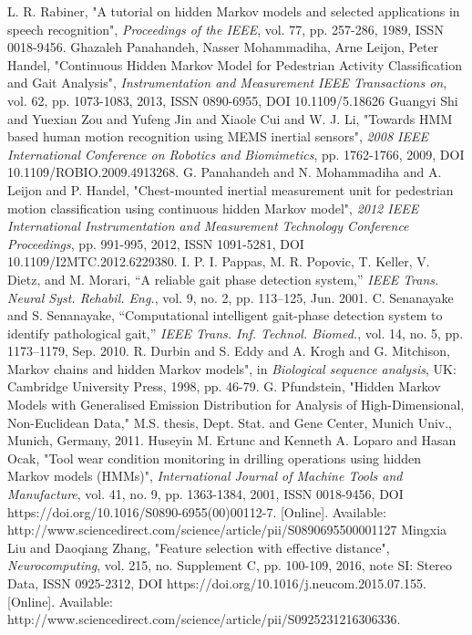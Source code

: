 

\begin{thebibliography}{5}
	
 L. R. Rabiner, "A tutorial on hidden Markov models and selected applications in speech recognition", \emph{Proceedings of the IEEE}, vol. 77, pp. 257-286, 1989, ISSN 0018-9456.
 Ghazaleh Panahandeh, Nasser Mohammadiha, Arne Leijon, Peter Handel, "Continuous Hidden Markov Model for Pedestrian Activity Classification and Gait Analysis", \emph{Instrumentation and Measurement IEEE Transactions on}, vol. 62, pp. 1073-1083, 2013, ISSN 0890-6955, DOI 10.1109/5.18626
 Guangyi Shi and Yuexian Zou and Yufeng Jin and Xiaole Cui and W. J. Li, "Towards HMM based human motion recognition using MEMS inertial sensors", \emph{2008 IEEE International Conference on Robotics and Biomimetics}, pp. 1762-1766, 2009, DOI 10.1109/ROBIO.2009.4913268.
 G. Panahandeh and N. Mohammadiha and A. Leijon and P. Handel, "Chest-mounted inertial measurement unit for pedestrian motion classification using continuous hidden Markov model", \emph{2012 IEEE International Instrumentation and Measurement Technology Conference Proceedings}, pp. 991-995, 2012, ISSN 1091-5281, DOI 10.1109/I2MTC.2012.6229380.
 I. P. I. Pappas, M. R. Popovic, T. Keller, V. Dietz, and M. Morari, “A
reliable gait phase detection system,” \emph{IEEE Trans. Neural Syst. Rehabil.
	Eng.}, vol. 9, no. 2, pp. 113–125, Jun. 2001.
 C. Senanayake and S. Senanayake, “Computational intelligent gait-phase
detection system to identify pathological gait,” \emph{IEEE Trans. Inf. Technol.
	Biomed.}, vol. 14, no. 5, pp. 1173–1179, Sep. 2010.
 R. Durbin and S. Eddy and A. Krogh and G. Mitchison, Markov chains and hidden Markov models", in \emph{Biological sequence analysis}, UK: Cambridge University Press, 1998, pp. 46-79.
G. Pfundstein, "Hidden Markov Models with Generalised Emission Distribution for Analysis of High-Dimensional, Non-Euclidean Data," M.S. thesis, Dept. Stat. and Gene Center, Munich Univ., Munich, Germany, 2011.
 Huseyin M. Ertunc and Kenneth A. Loparo and Hasan Ocak, "Tool wear condition monitoring in drilling operations using hidden Markov models (HMMs)", \emph{International Journal of Machine Tools and Manufacture}, vol. 41, no. 9, pp. 1363-1384, 2001, ISSN 0018-9456, DOI https://doi.org/10.1016/S0890-6955(00)00112-7. [Online]. Available:  http://www.sciencedirect.com/science/article/pii/S0890695500001127
 Mingxia Liu and Daoqiang Zhang, "Feature selection with effective distance", \emph{Neurocomputing}, vol. 215, no. Supplement C, pp. 100-109, 2016, note SI: Stereo Data, ISSN 0925-2312, DOI https://doi.org/10.1016/j.neucom.2015.07.155. [Online]. Available: http://www.sciencedirect.com/science/article/pii/S0925231216306336. 

\end{thebibliography}
